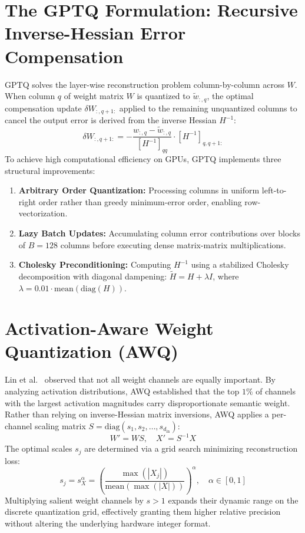 \documentclass[12pt,a4paper,oneside]{report}
\begin{document}
\section{The GPTQ Formulation: Recursive Inverse-Hessian Error Compensation}
GPTQ \cite{frantar2023gptq} solves the layer-wise reconstruction problem column-by-column across $W$. When column $q$ of weight matrix $W$ is quantized to $\widetilde{w}_{:, q}$, the optimal compensation update $\delta W_{:, q+1:}$ applied to the remaining unquantized columns to cancel the output error is derived from the inverse Hessian $H^{-1}$:
\begin{equation}
    \delta W_{:, q+1:} = - \frac{w_{:, q} - \widetilde{w}_{:, q}}{[H^{-1}]_{qq}} \cdot [H^{-1}]_{q, q+1:}
\end{equation}
To achieve high computational efficiency on GPUs, GPTQ implements three structural improvements:
\begin{enumerate}
    \item \textbf{Arbitrary Order Quantization:} Processing columns in uniform left-to-right order rather than greedy minimum-error order, enabling row-vectorization.
    \item \textbf{Lazy Batch Updates:} Accumulating column error contributions over blocks of $B = 128$ columns before executing dense matrix-matrix multiplications.
    \item \textbf{Cholesky Preconditioning:} Computing $H^{-1}$ using a stabilized Cholesky decomposition with diagonal dampening: $\widetilde{H} = H + \lambda I$, where $\lambda = 0.01 \cdot \text{mean}(\text{diag}(H))$.
\end{enumerate}

\section{Activation-Aware Weight Quantization (AWQ)}
Lin et al.~\cite{lin2024awq} observed that not all weight channels are equally important. By analyzing activation distributions, AWQ established that the top $1\%$ of channels with the largest activation magnitudes carry disproportionate semantic weight. Rather than relying on inverse-Hessian matrix inversions, AWQ applies a per-channel scaling matrix $S = \text{diag}(s_1, s_2, \dots, s_{d_{\text{in}}})$:
\begin{equation}
    W' = W S, \quad X' = S^{-1} X
\end{equation}
The optimal scales $s_j$ are determined via a grid search minimizing reconstruction loss:
\begin{equation}
    s_j = s_X^{\alpha} = \left( \frac{\max(|X_j|)}{\text{mean}(\max(|X|))} \right)^\alpha, \quad \alpha \in [0, 1]
\end{equation}
Multiplying salient weight channels by $s > 1$ expands their dynamic range on the discrete quantization grid, effectively granting them higher relative precision without altering the underlying hardware integer format.
\end{document}
